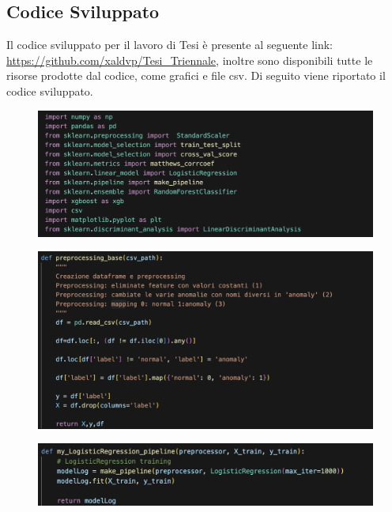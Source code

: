 \begin{appendices}
\chapter{Codice Sviluppato}
Il codice sviluppato per il lavoro di Tesi \`e presente al seguente link: \url{https://github.com/xaldvp/Tesi_Triennale}, inoltre sono disponibili tutte le risorse prodotte dal codice, come grafici e file csv. Di seguito viene riportato il codice sviluppato.

\begin{figure}[H]
    \centering
    \includegraphics[width=1\linewidth]{1.png}
    \label{fig:enter-label}
\end{figure}

\begin{figure}[H]
    \centering
    \includegraphics[width=1\linewidth]{2.png}
    \label{fig:enter-label}
\end{figure}

\begin{figure}[H]
    \centering
    \includegraphics[width=1\linewidth]{3.png}
    \label{fig:enter-label}
\end{figure}


\end{appendices}
